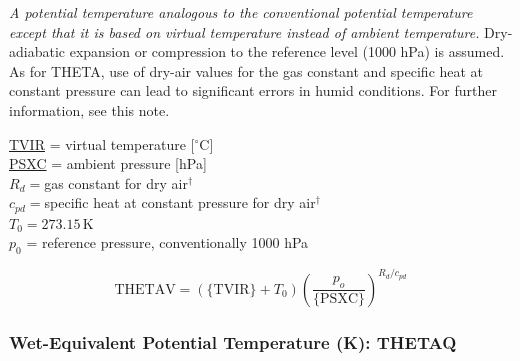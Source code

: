 \documentclass[
]{book}
\begin{document}
\emph{A potential temperature analogous to the conventional potential temperature except that it is based on virtual temperature instead of ambient temperature.} Dry-adiabatic expansion or compression to the reference level (1000 hPa) is assumed. As for THETA, use of dry-air values for the gas constant and specific heat at constant pressure can lead to significant errors in humid conditions. For further information, see this note.

\protect\hyperlink{TVIR}{TVIR} = virtual temperature {[}\(^{\circ}\mathrm{C}\){]}\\
\protect\hyperlink{psx}{PSXC} = ambient pressure {[}hPa{]}\\
\(R_{d}=\)gas constant for dry air\(^{\dagger}\)\\
\(c_{pd}=\)specific heat at constant pressure for dry air\(^{\dagger}\)\\
\(T_{0}=273.15\,\)K\\
\(p_{0}\) = reference pressure, conventionally 1000 hPa

\begin{equation}
\mathrm{THETAV}=\left(\mathrm{\{TVIR\}}+T_{0}\right)\left(\frac{p_{o}}{\mathrm{\{PSXC\}}}\right)^{R_{d}/c_{pd}}
\label{eq:THETAV}
\end{equation}

\hypertarget{thetaq}{%
\subsubsection*{Wet-Equivalent Potential Temperature (K): THETAQ}\label{thetaq}}
\end{document}
